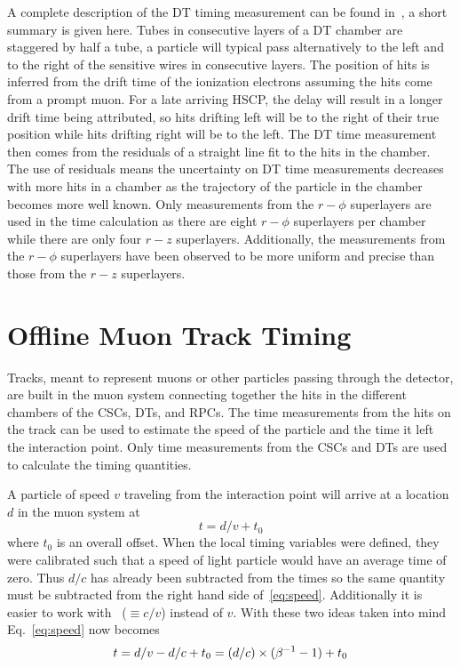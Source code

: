 A complete description of the DT timing measurement can be found in~\cite{2007AN049}, a short summary is given here.
Tubes in consecutive layers of a DT chamber are staggered by half a tube, a particle will typical pass alternatively to the left and to the right of the
sensitive wires in consecutive layers.
The position of hits is inferred from the drift time of the ionization electrons assuming the hits come from a prompt muon.
For a late arriving HSCP, the delay will result in a longer drift time being attributed, so hits drifting
left will be to the right of their true position while hits drifting right will be to the left.
The DT time measurement then comes from the residuals of a straight line fit to the hits in the chamber.
The use of residuals means the uncertainty on DT time measurements decreases with more hits in a chamber as the trajectory of the particle in the
chamber becomes more well known. Only measurements from the $r-\phi$ superlayers are used in the time calculation as there are eight $r-\phi$ superlayers
per chamber while there are only four $r-z$ superlayers. Additionally, the measurements from the $r-\phi$ superlayers have been observed to be more uniform and precise than
those from the $r-z$ superlayers.

\section{Offline Muon Track Timing}

Tracks, meant to represent muons or other particles passing through the detector, are built in the muon system connecting together the hits in the different chambers of
the CSCs, DTs, and RPCs. The time measurements from the hits on the track can be used to estimate the speed of the particle and the time it left the interaction point.
Only time measurements from the CSCs and DTs are used to calculate the timing quantities.

A particle of speed $v$ traveling from the interaction point will arrive at a location $d$ in the muon system at
\begin{equation}
t = d/v + t_0
\label{eq:speed}
\end{equation}
where $t_0$ is an overall offset. When the local timing variables were defined, they were calibrated such that a speed of light particle would have an average time
of zero. Thus $d/c$ has already been subtracted from the times so the same quantity must be subtracted from the right hand side of~\ref{eq:speed}.
Additionally it is easier to work with \invbeta\ ($\equiv{c/v}$) instead of $v$. With these two ideas taken into mind Eq.~\ref{eq:speed} now becomes
\begin{equation}
t = d/v - d/c + t_0 = (d / c) \times (\beta^{-1} - 1) + t_0 \\
\label{eq:speedred}
\end{equation}

